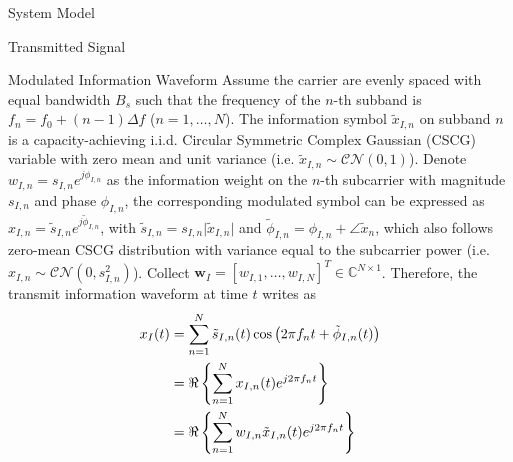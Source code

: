 \documentclass{IEEEtran}
\begin{document}
\begin{section} {System Model}
	\begin{subsection}	{Transmitted Signal}

		\begin{subsubsection} {Modulated Information Waveform}
			Assume the carrier are evenly spaced with equal bandwidth $B_s$ such that the frequency of the $n$-th subband is $f_n = f_0+(n-1) \Delta f$ ($n = 1,\dots,N$). The information symbol $\tilde{x}_{I,n}$ on subband $n$ is a capacity-achieving i.i.d. Circular Symmetric Complex Gaussian (CSCG) variable with zero mean and unit variance (i.e. $\tilde{x}_{I,n} \sim \mathcal{CN}(0,1)$). Denote $w_{I,n} = s_{I,n} e^{j\phi_{I,n}}$ as the information weight on the $n$-th subcarrier with magnitude $s_{I,n}$ and phase $\phi_{I,n}$, the corresponding modulated symbol can be expressed as $x_{I,n} = \tilde{s}_{I,n} e^{j\tilde{\phi}_{I,n}}$, with $\tilde{s}_{I,n} = s_{I,n} \lvert\tilde{x}_{I,n}\rvert$ and $\tilde{\phi}_{I,n} = \phi_{I,n} + \angle{\tilde{x}_n}$, which also follows zero-mean CSCG distribution with variance equal to the subcarrier power (i.e. $x_{I,n} \sim \mathcal{CN}(0,s_{I,n}^2)$). Collect $\boldsymbol{w}_I=[w_{I,1},\dots,w_{I,N}]^T \in \mathbb{C}^{N \times 1}$. Therefore, the transmit information waveform at time $t$ writes as
			\begin{equation}	\label{eq:x_{I}(t)}
				\begin{split}
					x_{I}(t)
					&= \sum_{n=1}^{N} \tilde{s}_{I,n}(t) \cos \left( 2 \pi f_n t + \tilde{\phi}_{I,n}(t) \right)	\\
					&= \Re \left\{ \sum_{n=1}^{N} x_{I,n}(t) e^{j2 \pi f_n t} \right\}	\\
					&= \Re \left\{ \sum_{n=1}^{N} w_{I,n} \tilde{x}_{I,n}(t) e^{j2 \pi f_n t} \right\}
				\end{split}
			\end{equation}
		\end{subsubsection}


\end{subsection}
\end{section}
\end{document}
